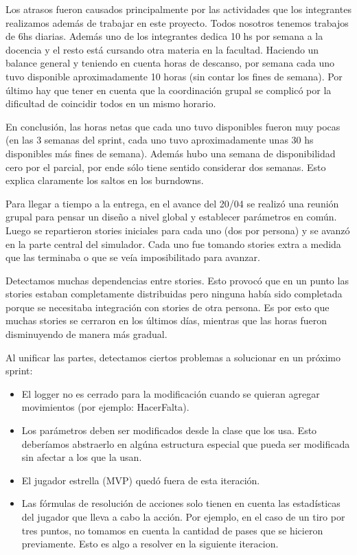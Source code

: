 Los atrasos fueron causados principalmente por las actividades que los integrantes realizamos además de trabajar en este proyecto. Todos
nosotros tenemos trabajos de 6hs diarias. Adem\'as uno de los integrantes dedica 10 hs por semana a la docencia y el resto est\'a cursando otra materia
en la facultad. Haciendo un balance general y teniendo en cuenta horas de descanso, por semana cada uno tuvo disponible aproximadamente 10 horas (sin
contar los fines de semana). Por último hay que tener en cuenta que la coordinación grupal se complicó por la dificultad de coincidir todos en un mismo
horario.

En conclusión, las horas netas que cada uno tuvo disponibles fueron muy pocas (en las 3 semanas del sprint, cada uno tuvo aproximadamente unas 30 hs
disponibles más fines de semana). Además hubo una semana de disponibilidad cero por el parcial, por ende sólo tiene sentido considerar
dos semanas. Esto explica claramente los saltos en los burndowns.

Para llegar a tiempo a la entrega, en el avance del 20/04 se realizó una reunión grupal para pensar un diseño a nivel global y establecer parámetros
en común. Luego se repartieron stories iniciales para cada uno (dos por persona) y se avanzó en la parte central del simulador. Cada uno fue tomando
stories extra a medida que las terminaba o que se veía imposibilitado para avanzar.

Detectamos muchas dependencias entre stories. Esto provocó que en un punto las stories estaban completamente distribuidas pero ninguna había sido
completada porque se necesitaba integración con stories de otra persona. Es por esto que muchas stories se cerraron en los últimos días, mientras
que las horas fueron disminuyendo de manera más gradual.

Al unificar las partes, detectamos ciertos problemas a solucionar en un próximo sprint:
\begin{itemize}
 \item El logger no es cerrado para la modificación cuando se quieran agregar movimientos (por ejemplo: HacerFalta).
 \item Los parámetros deben ser modificados desde la clase que los usa. Esto deberíamos abstraerlo en algúna estructura especial que pueda
 ser modificada sin afectar a los que la usan.
 \item El jugador estrella (MVP) quedó fuera de esta iteración.
 \item Las fórmulas de resolución de acciones solo tienen en cuenta las estadísticas del jugador que lleva a cabo la acción. Por ejemplo, en el caso de un tiro por tres puntos, no tomamos en cuenta la cantidad de pases que se hicieron previamente. Esto es algo a resolver en la siguiente iteracion.
\end{itemize}
